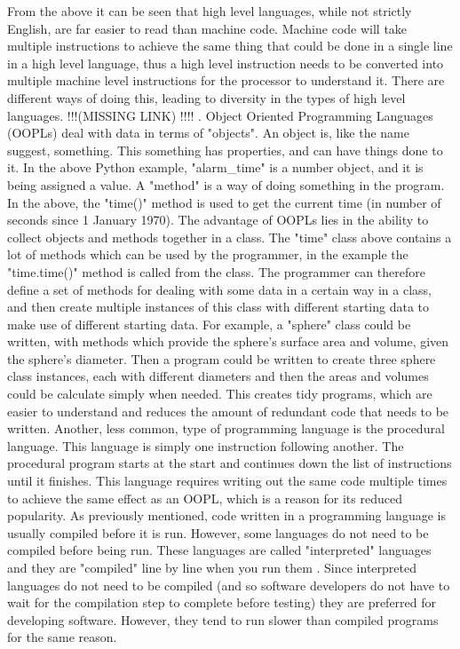 \documentclass[twoside,a4]{report}
\def\hi{\huge{!!!}}
\def\nohi{!!!! \normalsize}
\begin{document}
	From the above it can be seen that high level languages, while not strictly English, are far easier to read than machine code. Machine code will take multiple instructions to achieve the same thing that could be done in a single line in a high level language, thus a high level instruction needs to be converted into multiple machine level instructions for the processor to understand it. There are different ways of doing this, leading to diversity in the types of high level languages. \hi (MISSING LINK) \nohi. Object Oriented Programming Languages (OOPLs) deal with data in terms of "objects"\cite{proglangwhatisoopl}. An object is, like the name suggest, something. This something has properties, and can have things done to it. In the above Python example, "alarm\_time" is a number object, and it is being assigned a value. A "method" is a way of doing something in the program. In the above, the "time()" method is used to get the current time (in number of seconds since 1 January 1970). The advantage of OOPLs lies in the ability to collect objects and methods together in a class. The "time" class above contains a lot of methods which can be used by the programmer, in the example the "time.time()" method is called from the class. The programmer can therefore define a set of methods for dealing with some data in a certain way in a class, and then create multiple instances of this class with different starting data to make use of different starting data. For example, a "sphere" class could be written, with methods which provide the sphere's surface area and volume, given the sphere's diameter. Then a program could be written to create three sphere class instances, each with different diameters and then the areas and volumes could be calculate simply when needed. This creates tidy programs, which are easier to understand and reduces the amount of redundant code that needs to be written.\newline \newline  \noindent
	Another, less common, type of programming language is the procedural language. This language is simply one instruction following another\cite{proglangwhatisoopl}. The procedural program starts at the start and continues down the list of instructions until it finishes. This language requires writing out the same code multiple times to achieve the same effect as an OOPL, which is a reason for its reduced popularity.\newline \newline  \noindent
	As previously mentioned, code written in a programming language is usually compiled before it is run. However, some languages do not need to be compiled before being run. These languages are called "interpreted" languages and they are "compiled" line by line when you run them \cite{proglanginterp}. Since interpreted languages do not need to be compiled (and so software developers do not have to wait for the compilation step to complete before testing) they are preferred for developing software. However, they tend to run slower than compiled programs for the same reason.\newline \newline  \noindent
\end{document}
